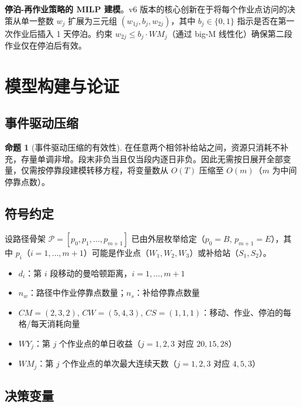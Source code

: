 \documentclass[12pt,a4paper]{ctexart}
\theoremstyle{definition}
\newtheorem{proposition}{命题}[section]
\begin{document}
\textbf{停泊-再作业策略的 MILP 建模}。v6 版本的核心创新在于将每个作业点访问的决策从单一整数 $w_j$ 扩展为三元组 $(w_{1j}, b_j, w_{2j})$，其中 $b_j\in\{0,1\}$ 指示是否在第一次作业后插入 1 天停泊。约束 $w_{2j}\le b_j\cdot WM_j$（通过 big-M 线性化）确保第二段作业仅在停泊后有效。

\section{模型构建与论证}

\subsection{事件驱动压缩}

\begin{proposition}[事件驱动压缩的有效性]\label{prop:event-compress}
  在任意两个相邻补给站之间，资源只消耗不补充，存量单调非增。段末非负当且仅当段内逐日非负。因此无需按日展开全部变量，仅需按停靠段建模转移方程，将变量数从 $O(T)$ 压缩至 $O(m)$（$m$ 为中间停靠点数）。
\end{proposition}

\subsection{符号约定}

设路径骨架 $\mathcal{P}=[p_0,p_1,\dots,p_{m+1}]$ 已由外层枚举给定（$p_0=B$, $p_{m+1}=E$），其中 $p_i$（$i=1,\dots,m+1$）可能是作业点（$W_1,W_2,W_3$）或补给站（$S_1,S_2$）。

\begin{itemize}
  \item $d_i$：第 $i$ 段移动的曼哈顿距离，$i=1,\dots,m+1$
  \item $n_w$：路径中作业停靠点数量；$n_s$：补给停靠点数量
  \item $CM=(2,3,2)$, $CW=(5,4,3)$, $CS=(1,1,1)$：移动、作业、停泊的每格/每天消耗向量
  \item $WY_j$：第 $j$ 个作业点的单日收益（$j=1,2,3$ 对应 $20,15,28$）
  \item $WM_j$：第 $j$ 个作业点的单次最大连续天数（$j=1,2,3$ 对应 $4,5,3$）
\end{itemize}

\subsection{决策变量}
\end{document}
